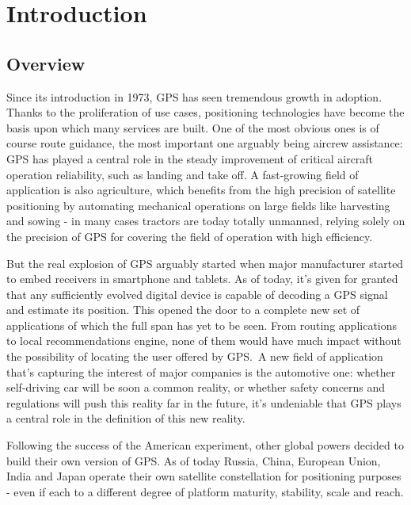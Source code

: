 \chapter{Introduction}
\label{introduction}

\section{Overview}
Since its introduction in 1973, GPS has seen tremendous growth in adoption.
Thanks to the proliferation of use cases, positioning technologies have become
the basis upon which many services are built. One of the most obvious ones is of
course route guidance, the most important one arguably being aircrew assistance:
GPS has played a central role in the steady improvement of critical aircraft
operation reliability, such as landing and take off. A fast-growing field of
application is also agriculture, which benefits from the high precision of
satellite positioning by automating mechanical operations on large fields like
harvesting and sowing - in many cases tractors are today totally unmanned,
relying solely on the precision of GPS for covering the field of operation with
high efficiency.

But the real explosion of GPS arguably started when major manufacturer started
to embed receivers in smartphone and tablets. As of today, it's given for
granted that any sufficiently evolved digital device is capable of decoding a
GPS signal and estimate its position. This opened the door to a complete new set
of applications of which the full span has yet to be seen. From routing
applications to local recommendations engine, none of them would have much
impact without the possibility of locating the user offered by GPS.\
A new field of application that's capturing the interest of major companies is
the automotive one: whether self-driving car will be soon a common reality, or
whether safety concerns and regulations will push this reality far in the
future, it's undeniable that GPS plays a central role in the definition of this
new reality.

\vspace{\baselineskip}

Following the success of the American experiment, other global powers decided to
build their own version of GPS. As of today Russia, China, European Union, India
and Japan operate their own satellite constellation for positioning purposes -
even if each to a different degree of platform maturity, stability, scale and
reach.

